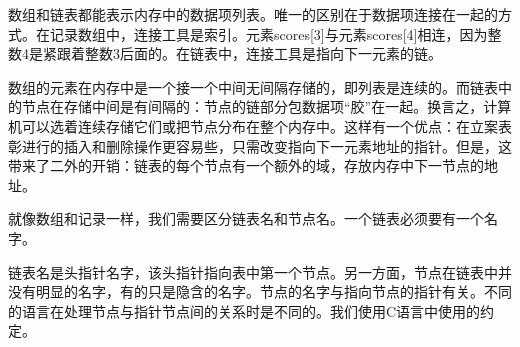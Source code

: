 数组和链表都能表示内存中的数据项列表。唯一的区别在于数据项连接在一起的方式。在记录数组中，连接工具是索引。元素scores[3]与元素scores[4]相连，因为整数4是紧跟着整数3后面的。在链表中，连接工具是指向下一元素的链。

数组的元素在内存中是一个接一个中间无间隔存储的，即列表是连续的。而链表中的节点在存储中间是有间隔的：节点的链部分包数据项“胶”在一起。换言之，计算机可以选着连续存储它们或把节点分布在整个内存中。这样有一个优点：在立案表彰进行的插入和删除操作更容易些，只需改变指向下一元素地址的指针。但是，这带来了二外的开销：链表的每个节点有一个额外的域，存放内存中下一节点的地址。

就像数组和记录一样，我们需要区分链表名和节点名。一个链表必须要有一个名字。

链表名是头指针名字，该头指针指向表中第一个节点。另一方面，节点在链表中并没有明显的名字，有的只是隐含的名字。节点的名字与指向节点的指针有关。不同的语言在处理节点与指针节点间的关系时是不同的。我们使用C语言中使用的约定。
